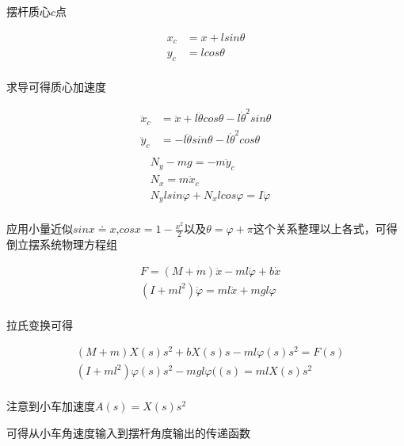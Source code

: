 \documentclass{MathorCupmodeling}
\begin{document}
摆杆质心$c$点
	
\begin{equation}
\begin{aligned}
x_c&=x+lsin\theta\\
y_c&=lcos\theta\\
\end{aligned}
\end{equation}

求导可得质心加速度

\begin{equation}
\begin{aligned}
\ddot x_c&=\ddot x+l\ddot{\theta}cos\theta-l\dot{\theta}^2sin\theta\\
\ddot y_c&=-l\ddot{\theta}sin\theta-l\dot{\theta}^2cos\theta\\
\end{aligned}
\end{equation}
\begin{equation}
\begin{aligned}
&N_y-mg=-m\ddot y_c\\
&N_x=m\ddot x_c\\
&N_ylsin\varphi+N_xlcos\varphi=I\ddot{\varphi}\\
\end{aligned}
\end{equation}

应用小量近似$sinx\doteq x$,$cosx=1-\frac{x^2}{2}$以及$\theta=\varphi+\pi$这个关系整理以上各式，可得倒立摆系统物理方程组

\begin{equation}
\begin{aligned}
&F=(M+m)\ddot x-ml\ddot{\varphi}+b\dot x\\
&(I+ml^2)\ddot{\varphi}=ml\ddot x+mgl\varphi\\
\end{aligned}
\end{equation}

拉氏变换可得

\begin{equation}
\begin{aligned}
&(M+m)X(s)s^2+bX(s)s-ml\varphi(s)s^2=F(s)\\
&(I+ml^2)\varphi(s)s^2-mgl\varphi((s)=mlX(s)s^2\\
\end{aligned}
\end{equation}

注意到小车加速度$A(s)=X(s)s^2$

可得从小车角速度输入到摆杆角度输出的传递函数
\end{document}
